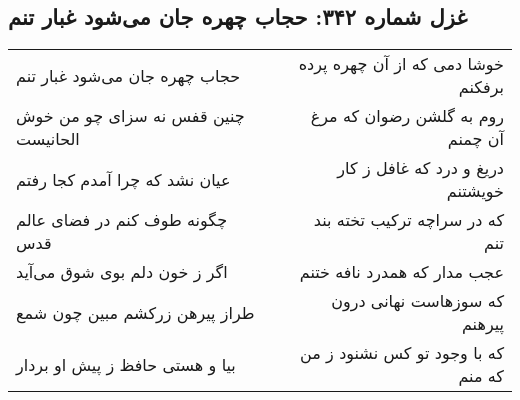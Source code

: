\begin{center}
\section*{غزل شماره ۳۴۲: حجاب چهره جان می‌شود غبار تنم}
\label{sec:sh342}
\begin{longtable}{l p{0.5cm} r}
حجاب چهره جان می‌شود غبار تنم
&&
خوشا دمی که از آن چهره پرده برفکنم
\\
چنین قفس نه سزای چو من خوش الحانیست
&&
روم به گلشن رضوان که مرغ آن چمنم
\\
عیان نشد که چرا آمدم کجا رفتم
&&
دریغ و درد که غافل ز کار خویشتنم
\\
چگونه طوف کنم در فضای عالم قدس
&&
که در سراچه ترکیب تخته بند تنم
\\
اگر ز خون دلم بوی شوق می‌آید
&&
عجب مدار که همدرد نافه ختنم
\\
طراز پیرهن زرکشم مبین چون شمع
&&
که سوزهاست نهانی درون پیرهنم
\\
بیا و هستی حافظ ز پیش او بردار
&&
که با وجود تو کس نشنود ز من که منم
\\
\end{longtable}
\end{center}
